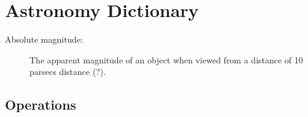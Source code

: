 \chapter{Astronomy Dictionary}
		
		\begin{description}
			
			\item[Absolute magnitude:] The apparent magnitude of an object when viewed from a distance of 10 parsecs distance (?).
			
		\end{description}
        

\section{Operations}

